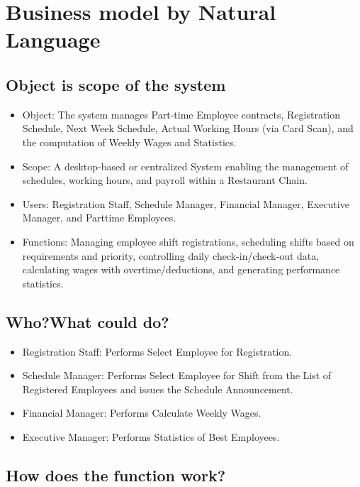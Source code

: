 \chapter{Business model by Natural Language}
\section{Object is scope of the system}

\begin{itemize}
    \item Object: The system manages Part-time Employee contracts, Registration Schedule, Next Week Schedule, Actual Working Hours (via Card Scan), and the computation of Weekly Wages and Statistics.
    \item Scope: A desktop-based or centralized System enabling the management of schedules, working hours, and payroll within a Restaurant Chain.
    \item Users: Registration Staff, Schedule Manager, Financial Manager, Executive Manager, and Parttime Employees.
    \item Functions: Managing employee shift registrations, scheduling shifts based on requirements and priority, controlling daily check-in/check-out data, calculating wages with overtime/deductions, and generating performance statistics.
\end{itemize}

\section{Who?What could do?}
\begin{itemize}
    \item Registration Staff: Performs Select Employee for Registration.
    \item Schedule Manager: Performs Select Employee for Shift from the List of Registered Employees and issues the Schedule Announcement.
    \item Financial Manager: Performs Calculate Weekly Wages.
    \item Executive Manager: Performs Statistics of Best Employees.

\end{itemize}

\section{How does the function work?}
